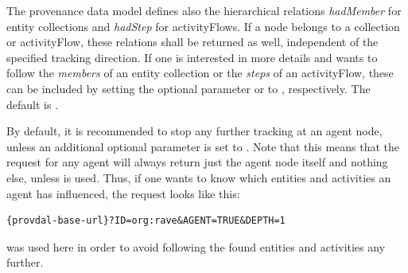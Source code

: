 The provenance data model defines also the hierarchical relations \emph{hadMember} for entity collections and \emph{hadStep} for activityFlows. If a node belongs to a collection or activityFlow, these relations shall be returned as well, independent of the specified tracking direction.
If one is interested in more details and wants to follow the \emph{members} of an entity collection or the \emph{steps} of an activityFlow, these can be included by setting the optional parameter  or  to , respectively. The default is .

By default, it is recommended to stop any further tracking at an agent node, unless an additional optional parameter  is set to . Note that this means that the request for any agent will always return just the agent node itself and nothing else, unless  is used. Thus, if one wants to know which entities and activities an agent has influenced, the request looks like this:

\begin{verbatim}
{provdal-base-url}?ID=org:rave&AGENT=TRUE&DEPTH=1
\end{verbatim}

\noindent
{} was used here in order to avoid following the found entities and activities any further.




